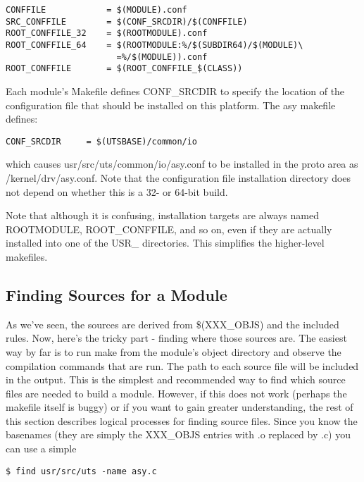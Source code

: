 \documentclass{article}
\begin{document}
\begin{verbatim}
CONFFILE            = $(MODULE).conf
SRC_CONFFILE        = $(CONF_SRCDIR)/$(CONFFILE)
ROOT_CONFFILE_32    = $(ROOTMODULE).conf
ROOT_CONFFILE_64    = $(ROOTMODULE:%/$(SUBDIR64)/$(MODULE)\
                      =%/$(MODULE)).conf
ROOT_CONFFILE       = $(ROOT_CONFFILE_$(CLASS))
\end{verbatim}

Each module's Makefile defines CONF\_SRCDIR to specify the location of the
configuration file that should be installed on this platform. The asy makefile
defines:

\begin{verbatim}
CONF_SRCDIR     = $(UTSBASE)/common/io
\end{verbatim}

which causes usr/src/uts/common/io/asy.conf to be installed in the proto area
as /kernel/drv/asy.conf. Note that the configuration file installation
directory does not depend on whether this is a 32- or 64-bit build.

Note that although it is confusing, installation targets are always named
ROOTMODULE, ROOT\_CONFFILE, and so on, even if they are actually installed into
one of the USR\_ directories. This simplifies the higher-level makefiles.

\subsection*{Finding Sources for a Module}

As we've seen, the sources are derived from \$(XXX\_OBJS) and the included
rules. Now, here's the tricky part - finding where those sources are. The
easiest way by far is to run make from the module's object directory and
observe the compilation commands that are run. The path to each source file
will be included in the output. This is the simplest and recommended way to
find which source files are needed to build a module. However, if this does not
work (perhaps the makefile itself is buggy) or if you want to gain greater
understanding, the rest of this section describes logical processes for finding
source files.
\vspace{0.1cm}
Since you know the basenames (they are simply the XXX\_OBJS entries with .o
replaced by .c) you can use a simple

\begin{verbatim}
$ find usr/src/uts -name asy.c
\end{verbatim}
\end{document}
